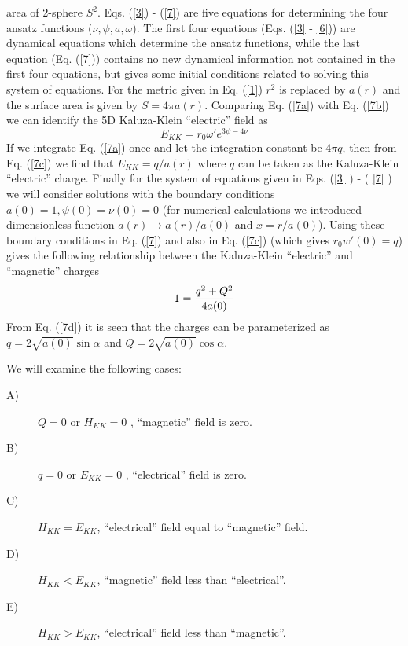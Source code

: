 area of 2-sphere $S^2$. Eqs. (\ref{3}) - (\ref{7}) are five equations for
determining the four ansatz functions ($\nu, \psi ,
a , \omega$). The first four equations (Eqs. (\ref{3} - \ref{6}))
are dynamical equations which determine the ansatz functions, 
while the last equation (Eq. (\ref{7})) contains no new dynamical
information not contained in the first four equations, but
gives some initial conditions related to solving this system
of equations. For the metric given in Eq. (\ref{1})
$r^2$ is replaced by $a(r)$ and the surface area 
is given by $S = 4 \pi a (r)$. Comparing Eq. (\ref{7a})
with Eq. (\ref{7b}) we can identify the 5D Kaluza-Klein
``electric'' field as
\begin{equation}
\label{7c}
E_{KK} = r_0 \omega ' e^{3 \psi - 4 \nu}
\end{equation}
If we integrate Eq. (\ref{7a}) once and let the integration
constant be $4 \pi q$, then from Eq. (\ref{7c}) we
find that $E_{KK} = q / a(r)$ where $q$ can be taken as the
Kaluza-Klein ``electric'' charge.
Finally for the system of equations given in Eqs.
(\ref{3} ) - ( \ref{7} ) we will consider solutions with
the boundary conditions $a(0) = 1 , \psi (0) = \nu (0) = 0$ 
(for numerical calculations we introduced dimensionless 
function $a(r)\to a(r)/a(0)$ and $x = r/a(0)$).
Using these boundary conditions in Eq. (\ref{7}) and also
in Eq. (\ref{7c}) (which gives $r _0 w' (0) = q$) gives the
following relationship between the Kaluza-Klein ``electric''
and ``magnetic'' charges
\begin{equation}
\label{7d}
1 = {q^2 + Q^2 \over 4a(0)}
\end{equation}
From Eq. (\ref{7d}) it is seen that the charges can be parameterized
as $q = 2 \sqrt{a(0)}\sin \alpha$ and $Q = 2 \sqrt{a(0)}\cos \alpha$.
\par 
We will examine the following cases: 
\begin{description} 
\item[A)] 
$Q=0$ or $H_{KK} = 0$ , ``magnetic'' field is zero.
\item[B)]
$q=0$ or $E_{KK} = 0$ , ``electrical'' field is zero. 
\item [C)]
$H_{KK} = E_{KK}$, ``electrical'' field equal to ``magnetic'' 
field.  
\item[D)] 
$H_{KK} < E_{KK}$, ``magnetic'' field less 
than ``electrical''. 
\item[E)] 
$H_{KK} > E_{KK}$, ``electrical'' field less 
than ``magnetic''.
\end{description}

